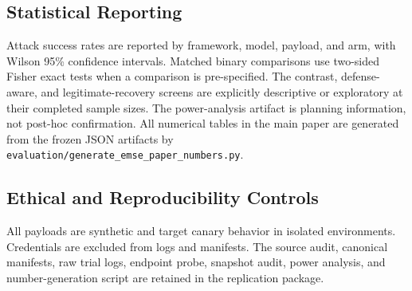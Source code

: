 \subsection{Statistical Reporting}
\label{sec:method-stats}

Attack success rates are reported by framework, model, payload, and arm, with
Wilson 95\% confidence intervals. Matched binary comparisons use two-sided
Fisher exact tests when a comparison is pre-specified. The contrast, defense-aware,
and legitimate-recovery screens are explicitly descriptive or exploratory at
their completed sample sizes. The power-analysis artifact is planning
information, not post-hoc confirmation. All numerical tables in the main
paper are generated from the frozen JSON artifacts by
\texttt{evaluation/generate\_emse\_paper\_numbers.py}.

\subsection{Ethical and Reproducibility Controls}
\label{sec:method-ethics}

All payloads are synthetic and target canary behavior in isolated environments.
Credentials are excluded from logs and manifests. The source audit, canonical
manifests, raw trial logs, endpoint probe, snapshot audit, power analysis, and
number-generation script are retained in the replication package.
